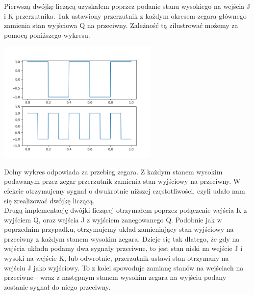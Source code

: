 \documentclass{article}
\begin{document}
            Pierwszą dwójkę liczącą uzyskałem poprzez podanie stanu wysokiego na wejścia J i K przerzutnika. Tak ustawiony przerzutnik z każdym okresem zegara głównego zamienia stan wyjściowa Q na przeciwny. Zależność tą zilustrować możemy za pomocą poniższego wykresu. 
            \begin{center}
                \includegraphics[height=6cm]{reports/plot/square_plot.png}\\
            \end{center}
            \FloatBarrier
            Dolny wykres odpowiada za przebieg zegara. Z każdym stanem wysokim podawanym przez zegar przerzutnik zamienia stan wyjściowy na przeciwny. W efekcie otrzymujemy sygnał o dwukrotnie niższej częstotliwości, czyli udało nam się zrealizować dwójkę liczącą.\\
            Drugą implementację dwójki liczącej otrzymałem poprzez połączenie wejścia K z wyjściem Q, oraz wejścia J z wyjściem zanegowanego Q. Podobnie jak w poprzednim przypadku, otrzymujemy układ zamieniający stan wyjściowy na przeciwny z każdym stanem wysokim zegara. Dzieje się tak dlatego, że gdy na wejścia układu podamy dwa sygnały przeciwne, to jest stan niski na wejście J i wysoki na wejście K, lub odwrotnie, przerzutnik ustawi stan otrzymany na wejściu J jako wyjściowy. To z kolei spowoduje zamianę stanów na wejściach na przeciwne - wraz z następnym stanem wysokim zegara na wyjściu podany zostanie sygnał do niego przeciwny. \\
\end{document}

